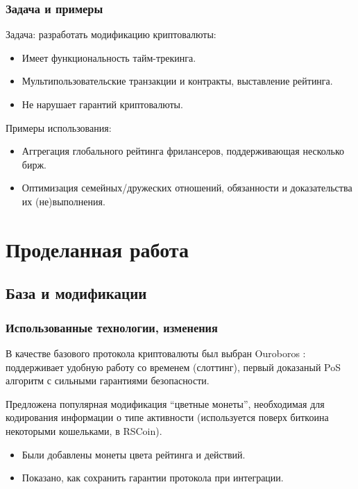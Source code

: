 \documentclass[11pt,handout,pdf,hyperref={unicode}]{beamer}
\begin{document}
\begin{frame}
  \frametitle{Задача и примеры}
  Задача: разработать модификацию криптовалюты:
  \begin{itemize}
  \item Имеет функциональность тайм-трекинга.
  \item Мультипользовательские транзакции и контракты, выставление рейтинга.
  \item Не нарушает гарантий криптовалюты.
  \end{itemize}

  Примеры использования:
  \begin{itemize}
    \item Аггрегация глобального рейтинга фрилансеров, поддерживающая
      несколько бирж.
    \item Оптимизация семейных/дружеских отношений, обязанности и
      доказательства их (не)выполнения.
  \end{itemize}
\end{frame}

\section{Проделанная работа}

\subsection{База и модификации}

\begin{frame}
  \frametitle{Использованные технологии, изменения}

  В качестве базового протокола криптовалюты был выбран Ouroboros
  \parencite{ouroboros}: поддерживает удобную работу со временем
  (слоттинг), первый доказаный PoS алгоритм с сильными гарантиями
  безопасности.

  Предложена популярная модификация ``цветные монеты'', необходимая
  для кодирования информации о типе активности (используется поверх
  биткоина некоторыми кошельками, в RSCoin).
  \begin{itemize}
  \item Были добавлены монеты цвета рейтинга и действий.
  \item Показано, как сохранить гарантии протокола при интеграции.
  \end{itemize}
\end{frame}
\end{document}
